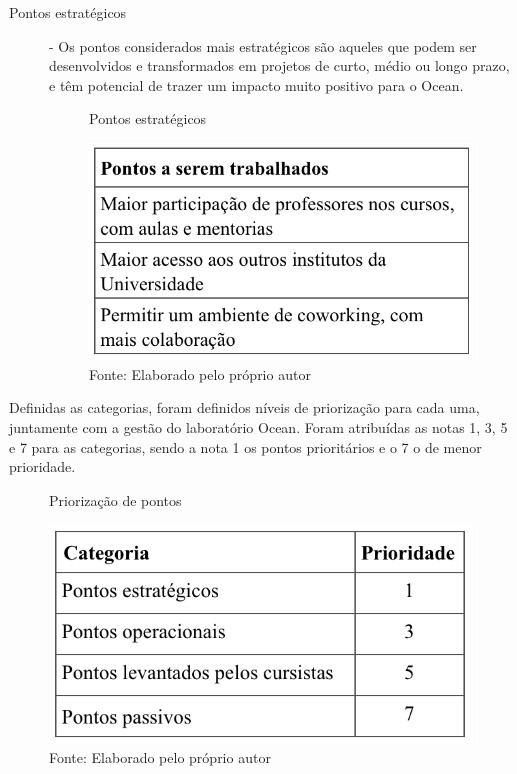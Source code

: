 \begin{description}
\item[Pontos estratégicos] - Os pontos considerados mais estratégicos são aqueles que podem ser desenvolvidos e transformados em projetos de curto, médio ou longo prazo, e têm potencial de trazer um impacto muito positivo para o Ocean.

\begin{figure}[H]
\caption{Pontos estratégicos}
\centerline{\includegraphics[scale=0.75]{img/pontosselecionadosestrategicos}}
\label{fig:pontosselecionadosestrategicos}
\caption* {Fonte: Elaborado pelo próprio autor}
\end{figure}

\end{description}

Definidas as categorias, foram definidos níveis de priorização para cada uma, juntamente com a gestão do laboratório Ocean. Foram atribuídas as notas 1, 3, 5 e 7 para as categorias, sendo a nota 1 os pontos prioritários e o 7 o de menor prioridade.

\begin{figure}[H]
\caption{Priorização de pontos}
\centerline{\includegraphics[scale=0.75]{img/priorizacao}}
\label{fig:priorizacao}
\caption* {Fonte: Elaborado pelo próprio autor}
\end{figure}

